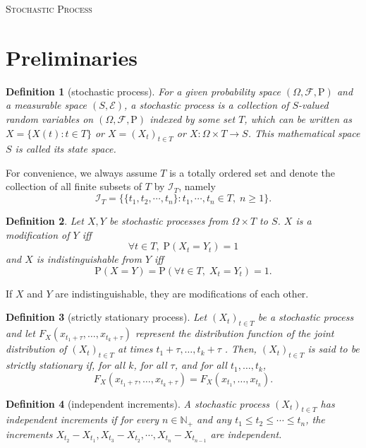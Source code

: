 \documentclass{article}
\newtheorem{definition}{Definition}[section]
\theoremstyle{nonumberplain}
\begin{document}
	\begin{center}
	\textsc{\Huge Stochastic Process}	
\end{center}
\vspace{1em} 

\section{Preliminaries}
\begin{definition}[stochastic process]
For a given probability space $(\Omega ,{\mathcal{F}},\mathrm{P})$ and a measurable space $(S,\mathcal{E})$, a \emph{stochastic process} is a collection of $S$-valued random variables on $(\Omega ,{\mathcal{F}},\mathrm{P})$ indexed by some set $T$, which can be written as $X=\{X(t):t\in T\}$ or $X=(X_t)_{t\in T}$ or $X:\Omega \times T\rightarrow S$. This mathematical space $S$ is called its state space. 
\end{definition}

For convenience, we always assume $T$ is a totally ordered set and denote the collection of all finite subsets of $T$ by $\mathcal{I}_T$, namely
\[
\mathcal{I}_T=\{\{t_1,t_2,\cdots,t_n\}:t_1,\cdots,t_n\in T,\;n\ge 1\}.
\]

\begin{definition}
Let $X, Y$ be stochastic processes from $\Omega\times T$ to $S$.
$X$ is a \emph{modification} of $Y$ iff
\[
\forall t \in T,\; \mathrm{P}(X_t=Y_t)=1
\]
and $X$ is \emph{indistinguishable} from $Y$ iff
\[
\mathrm{P}(X=Y)=\mathrm{P}(\forall t \in T,\; X_t=Y_t)=1.
\]
\end{definition}
If $X$ and $Y$ are indistinguishable, they are modifications of each other.


\begin{definition}[strictly stationary process]
	Let $(X_t)_{t\in T}$ be a stochastic process and let \newline $F_{{X}}(x_{{t_{1}+\tau }},\ldots ,x_{{t_{k}+\tau }})$ represent the  distribution function of the joint distribution of $(X_t)_{t\in T}$ at times $t_{1}+\tau ,\ldots ,t_{k}+\tau$ . Then, $(X_t)_{t\in T}$ is said to be strictly stationary if, for all $k$, for all $\tau$, and for all $ t_{1},\ldots ,t_{k}$,
	\[
	F_{{X}}(x_{{t_{1}+\tau }},\ldots ,x_{{t_{k}+\tau }})=F_{{X}}(x_{{t_{1}}},\ldots ,x_{{t_{k}}}).
	\]
\end{definition}

\begin{definition}[independent increments]
	A stochastic process $(X_t)_{t\in T}$ has \emph{independent increments} if for every $n\in \mathbb{N}_+$ and any $t_1\le t_2 \le\cdots\le t_n$, the increments $X_{t_2}-X_{t_1},X_{t_3}-X_{t_2},\cdots,X_{t_n}-X_{t_{n-1}}$ are independent.
\end{definition}
\end{document}
